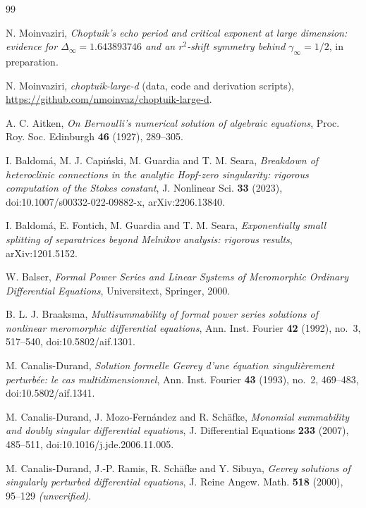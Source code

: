 \documentclass{amsart}
\numberwithin{equation}{section}
\theoremstyle{plain}
\theoremstyle{definition}
\theoremstyle{remark}
\begin{document}
\begin{thebibliography}{99}
\footnotesize

 N. Moinvaziri, \emph{Choptuik's echo period and critical exponent at large dimension: evidence for
$\Delta_\infty = 1.643893746$ and an $r^2$-shift symmetry behind $\gamma_\infty = 1/2$}, in preparation.

 N. Moinvaziri, \emph{choptuik-large-d} (data, code and derivation scripts),
\url{https://github.com/nmoinvaz/choptuik-large-d}.

 A. C. Aitken, \emph{On Bernoulli's numerical solution of algebraic equations}, Proc. Roy. Soc.
Edinburgh \textbf{46} (1927), 289--305.

 I. Baldom\'a, M. J. Capi\'nski, M. Guardia and T. M. Seara,
\emph{Breakdown of heteroclinic connections in the analytic Hopf-zero singularity: rigorous computation of the Stokes
constant}, J. Nonlinear Sci. \textbf{33} (2023), doi:10.1007/s00332-022-09882-x, arXiv:2206.13840.

 I. Baldom\'a, E. Fontich, M. Guardia and T. M. Seara, \emph{Exponentially small
splitting of separatrices beyond Melnikov analysis: rigorous results}, arXiv:1201.5152.

 W. Balser, \emph{Formal Power Series and Linear Systems of Meromorphic Ordinary Differential
Equations}, Universitext, Springer, 2000.

 B. L. J. Braaksma, \emph{Multisummability of formal power series solutions of nonlinear
meromorphic differential equations}, Ann. Inst. Fourier \textbf{42} (1992), no.~3, 517--540, doi:10.5802/aif.1301.

 M. Canalis-Durand, \emph{Solution formelle Gevrey d'une \'equation singuli\`erement
perturb\'ee: le cas multidimensionnel}, Ann. Inst. Fourier \textbf{43} (1993), no.~2, 469--483, doi:10.5802/aif.1341.

 M. Canalis-Durand, J. Mozo-Fern\'andez and R. Sch\"afke, \emph{Monomial
summability and doubly singular differential equations}, J. Differential Equations \textbf{233} (2007), 485--511,
doi:10.1016/j.jde.2006.11.005.

 M. Canalis-Durand, J.-P. Ramis, R. Sch\"afke and Y. Sibuya,
\emph{Gevrey solutions of singularly perturbed differential equations}, J. Reine Angew. Math. \textbf{518} (2000),
95--129 \emph{(unverified)}.


\end{thebibliography}
\end{document}
